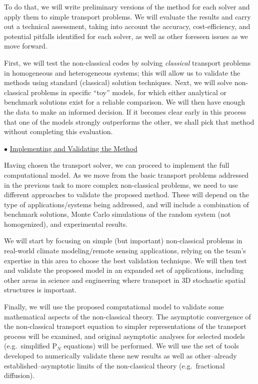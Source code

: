 \documentclass[12pt]{article}
\begin{document}
To do that, we will write preliminary versions of the method for each solver and apply them to simple transport problems.
We will evaluate the results and carry out a technical assessment, taking into account the accuracy, cost-efficiency, and potential pitfalls identified for each solver, as well as other foreseen issues as we move forward.

First, we will test the non-classical codes by solving \textit{classical} transport problems in homogeneous and heterogeneous systems; this will allow us to validate the methods using standard (classical) solution techniques.
Next, we will solve non-classical problems in specific ``toy'' models, for which either analytical or benchmark solutions exist for a reliable comparison.
We will then have enough the data to make an informed decision.
If it becomes clear early in this process that one of the models strongly outperforms the other, we shall pick that method without completing this evaluation.

$\bullet$ \underline{Implementing and Validating the Method}

Having chosen the transport solver, we can proceed to implement the full computational model.
As we move from the basic transport problems addressed in the previous task to more complex non-classical problems, we need to use different approaches to validate the proposed method.
These will depend on the type of applications/systems being addressed, and will include a combination of benchmark solutions, Monte Carlo simulations of the random system (not homogenized), and experimental results.

We will start by focusing on simple (but important) non-classical problems in real-world climate modeling/remote sensing applications, relying on the team's expertise in this area to choose the best validation technique.
We will then test and validate the proposed model in an expanded set of applications, including other areas in science and engineering where transport in 3D stochastic spatial structures is important.

Finally, we will use the proposed computational model to validate some mathematical aspects of the non-classical theory.
The asymptotic convergence of the non-classical transport equation to simpler representations of the transport process will be examined, and original asymptotic analyses for selected models (e.g.\ simplified P$_N$ equations) will be performed.
We will use the set of tools developed to numerically validate these new results as well as other--already established--asymptotic limits of the non-classical theory (e.g.\ fractional diffusion).
\end{document}
